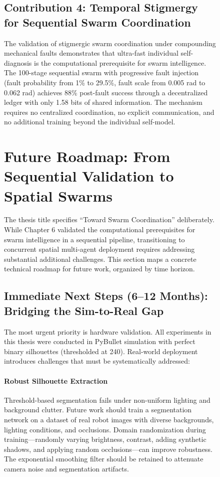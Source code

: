 \documentclass[12pt,a4paper,oneside]{report}
\begin{document}
\begin{figure}[H]
\subsection{Contribution 4: Temporal Stigmergy for Sequential Swarm Coordination}

The validation of stigmergic swarm coordination under compounding mechanical faults demonstrates that ultra-fast individual self-diagnosis is the computational prerequisite for swarm intelligence. The 100-stage sequential swarm with progressive fault injection (fault probability from 1\% to 29.5\%, fault scale from 0.005 rad to 0.062 rad) achieves 88\% post-fault success through a decentralized ledger with only 1.58 bits of shared information. The mechanism requires no centralized coordination, no explicit communication, and no additional training beyond the individual self-model.

\section{Future Roadmap: From Sequential Validation to Spatial Swarms}

The thesis title specifies ``Toward Swarm Coordination'' deliberately. While Chapter 6 validated the computational prerequisites for swarm intelligence in a sequential pipeline, transitioning to concurrent spatial multi-agent deployment requires addressing substantial additional challenges. This section maps a concrete technical roadmap for future work, organized by time horizon.

\subsection{Immediate Next Steps (6--12 Months): Bridging the Sim-to-Real Gap}

The most urgent priority is hardware validation. All experiments in this thesis were conducted in PyBullet simulation with perfect binary silhouettes (thresholded at 240). Real-world deployment introduces challenges that must be systematically addressed:

\paragraph{Robust Silhouette Extraction}
Threshold-based segmentation fails under non-uniform lighting and background clutter. Future work should train a segmentation network on a dataset of real robot images with diverse backgrounds, lighting conditions, and occlusions. Domain randomization during training---randomly varying brightness, contrast, adding synthetic shadows, and applying random occlusions---can improve robustness. The exponential smoothing filter should be retained to attenuate camera noise and segmentation artifacts.


\end{figure}
\end{document}
